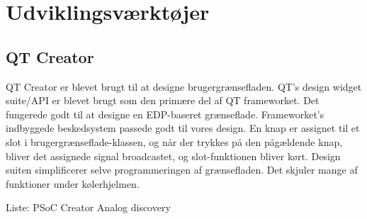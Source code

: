 \chapter{Udviklingsværktøjer}

\section{QT Creator}
QT Creator er blevet brugt til at designe brugergrænsefladen.
QT's design widget suite/API er blevet brugt som den primære del af QT frameworket. Det fungerede godt til at designe en EDP-baseret grænseflade. Frameworket's indbyggede beskedsystem passede godt til vores design.
En knap er assignet til et slot i brugergrænseflade-klassen, og når der trykkes på den pågældende knap, bliver det assignede signal broadcastet, og slot-funktionen bliver kørt.
Design suiten simplificerer selve programmeringen af grænsefladen. Det skjuler mange af funktioner under kølerhjelmen.

Liste:
PSoC Creator
Analog discovery
